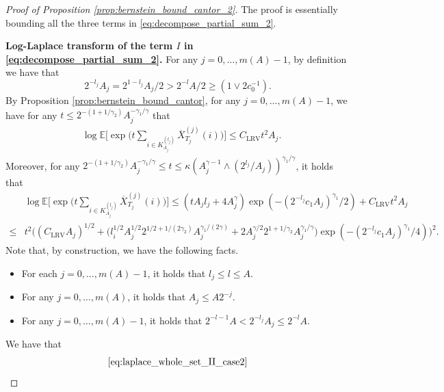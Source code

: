 \documentclass[11pt]{article}
\theoremstyle{plain}
\theoremstyle{definition}
\begin{document}
\begin{proof}[Proof of Proposition \ref{prop:bernstein_bound_cantor_2}]
The proof is essentially bounding all the three terms in \eqref{eq:decompose_partial_sum_2}.

\textbf{Log-Laplace transform of the term $I$ in \eqref{eq:decompose_partial_sum_2}.} For any $j = 0, \dots, m(A)-1$, by definition we have that
\begin{equation}\label{eq:decomp_property_Aj}
    2^{-l_j}A_j = 2^{1-l_j}A_j/2 > 2^{-l}A/2 \geq (1 \vee 2c_0^{-1}).
\end{equation}
By Proposition \ref{prop:bernstein_bound_cantor}, for any $j = 0, \dots, m(A)-1$, we have for any $t \leq 2^{-(1+1/\gamma_2)}A_j^{-\gamma_1/\gamma}$ that
\begin{equation}\label{eq:laplace_whole_set_II_case1}
\begin{aligned}
    &\log\mathbb{E}\Big[\exp\Big(t\sum_{i \in K_{A_j}^{(l_j)}}\overline{X}_{T_j}^{(j)}(i)\Big)\Big] \leq C_{\mathrm{LRV}}t^2A_j.
\end{aligned}
\end{equation}
Moreover, for any 
$2^{-(1+1/\gamma_2)}A_j^{-\gamma_1/\gamma} \leq t \leq \kappa(A_j^{\gamma-1} \wedge (2^{l_j}/A_j))^{\gamma_1/\gamma}$, it holds that
\begin{align}\label{eq:laplace_whole_set_II_case2}
    &\log\mathbb{E}\Big[\exp\Big(t\sum_{i \in K_{A_j}^{(l_j)}}\overline{X}_{T_j}^{(j)}(i)\Big)\Big]\leq (tA_jl_j + 4A_j^{\gamma})\exp(-(2^{-l_j}c_1A_j)^{\gamma_1}/2) + C_{\mathrm{LRV}}t^2A_j \nonumber \\
    \leq& t^2\Big((C_{\mathrm{LRV}}A_j)^{1/2} +  \big(l_i^{1/2}A_j^{1/2}2^{1/2+1/(2\gamma_2)}A_j^{\gamma_1/(2\gamma)} + 2A_j^{\gamma/2}2^{1+1/\gamma_2}A_j^{\gamma_1/\gamma}\big) \exp(-(2^{-l_j}c_1A_j)^{\gamma_1}/4)\Big)^2.
\end{align}
Note that, by construction, we have the following facts.
\begin{itemize}
    \item For each $j = 0, \dots, m(A)-1$, it holds that $l_j \leq l \leq A$.
    \item For any $j = 0, \dots, m(A)$, it holds that $A_j \leq A2^{-j}$.
    \item For any $j = 0, \dots, m(A)-1$, it holds that $2^{-l-1}A < 2^{-l_j}A_j \leq 2^{-l}A$.
\end{itemize}
We have that
\begin{equation*}
\begin{aligned}
    \eqref{eq:laplace_whole_set_II_case2} 

\end{aligned}
\end{equation*}
\end{proof}
\end{document}

